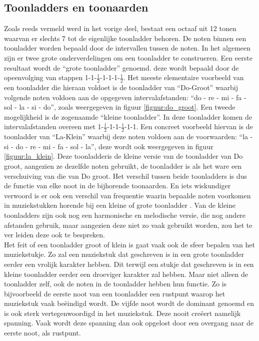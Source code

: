 \subsection{Toonladders en toonaarden}
Zoals reeds vermeld werd in het vorige deel, bestaat een octaaf uit 12 tonen waarvan er slechts 7 tot de eigenlijke toonladder behoren. De noten binnen een toonladder worden bepaald door de intervallen tussen de noten. In het algemeen zijn er twee grote onderverdelingen om een toonladder te construeren. Een eerste resultaat wordt de ``grote toonladder'' genoemd. deze wordt bepaald door de opeenvolging van stappen 1-1-$\frac{1}{2}$-1-1-1-$\frac{1}{2}$. Het meeste elementaire voorbeeld van een toonladder die hieraan voldoet is de toonladder van ``Do-Groot'' waarbij volgende noten voldoen aan de opgegeven intervalafstanden: ``do - re - mi - fa - sol - la - si - do'', zoals weergegeven in figuur \ref{figuur:do_groot}. Een tweede mogelijkheid is de zogenaamde ``kleine toonladder''. In deze toonladder komen de intervalafstanden overeen met 1-$\frac{1}{2}$-1-1-$\frac{1}{2}$-1-1. Een concreet voorbeeld hiervan is de toonladder van ``La-Klein'' waarbij deze noten voldoen aan de voorwaarden: ``la - si - do - re - mi - fa - sol - la'', deze wordt ook weergegeven in figuur \ref{figuur:la_klein}. Deze toonladderis de kleine versie van de toonladder van Do groot, aangezien ze dezelfde noten gebruikt, de toonladder is als het ware een verschuiving van die van Do groot. Het verschil tussen beide toonladders is dus de functie van elke noot in de bijhorende toonaarden. En iets wiskundiger verwoord is er ook een verschil van frequentie waarin bepaalde noten voorkomen in muziekstukken horende bij een kleine of grote toonladder \cite{book:musicAndProbability}. Van de kleine toonladders zijn ook nog een harmonische en melodische versie, die nog andere afstanden gebruik, maar aangezien deze niet zo vaak gebruikt worden, zou het te ver leiden deze ook te bespreken.\\
Het feit of een toonladder groot of klein is gaat vaak ook de sfeer bepalen van het muziekstukje. Zo zal een muziekstuk dat geschreven is in een grote toonladder eerder een vrolijk karakter hebben. Dit terwijl een stukje dat geschreven is in een kleine toonladder eerder een droeviger karakter zal hebben. Maar niet alleen de toonladder zelf, ook de noten in de toonladder hebben hun functie. Zo is bijvoorbeeld de eerste noot van een toonladder een rustpunt waarop het muziekstuk vaak be\"eindigd wordt. De vijfde noot wordt de dominant genoemd en is ook sterk vertegenwoordigd in het muziekstuk. Deze nooit cre\"eert namelijk spanning. Vaak wordt deze spanning dan ook opgelost door een overgang naar de eerste noot, als rustpunt.

